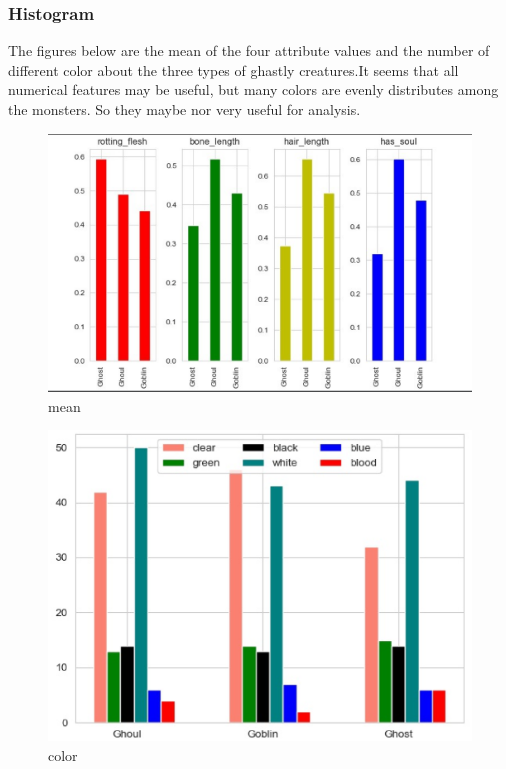 \subsubsection{ Histogram}
The figures below are the mean of the four attribute values  and the number of different color about the three types of ghastly creatures.It seems that all numerical features may be useful, but many colors are evenly distributes among the monsters. So they maybe nor very useful for analysis.\\


\begin{figure}[htbp]\centering
	\includegraphics[scale=0.3]{figures/his_1.eps}
	\caption{mean}
\end{figure}


\begin{figure}[htbp]\centering
	\includegraphics[scale=0.3]{figures/his_2.eps}
	\caption{color}
\end{figure}


